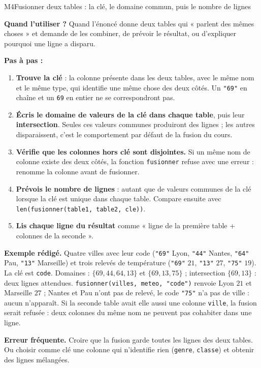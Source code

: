 \begin{fichemethode}{M4}{Fusionner deux tables : la clé, le domaine commun, puis le nombre de lignes}

\textbf{Quand l'utiliser ?} Quand l'énoncé donne deux tables qui « parlent des mêmes
choses » et demande de les combiner, de prévoir le résultat, ou d'expliquer pourquoi une
ligne a disparu.

\textbf{Pas à pas :}
\begin{enumerate}
  \item \textbf{Trouve la clé} : la colonne présente dans les deux tables, avec le même nom et
        le même type, qui identifie une même chose des deux côtés. Un \lstinline{"69"} en
        chaîne et un \lstinline{69} en entier ne se correspondront pas.
  \item \textbf{Écris le domaine de valeurs de la clé dans chaque table}, puis leur
        \textbf{intersection}. Seules ces valeurs communes produiront des lignes ; les autres
        disparaissent, c'est le comportement par défaut de la fusion du cours.
  \item \textbf{Vérifie que les colonnes hors clé sont disjointes.} Si un même nom de colonne
        existe des deux côtés, la fonction \lstinline{fusionner} refuse avec une erreur :
        renomme la colonne avant de fusionner.
  \item \textbf{Prévois le nombre de lignes} : autant que de valeurs communes de la clé
        lorsque la clé est unique dans chaque table. Compare ensuite avec
        \lstinline{len(fusionner(table1, table2, cle))}.
  \item \textbf{Lis chaque ligne du résultat} comme « ligne de la première table + colonnes de
        la seconde ».
\end{enumerate}

\textbf{Exemple rédigé.} Quatre villes avec leur code (\lstinline{"69"} Lyon,
\lstinline{"44"} Nantes, \lstinline{"64"} Pau, \lstinline{"13"} Marseille) et trois relevés
de température (\lstinline{"69"} $21$, \lstinline{"13"} $27$, \lstinline{"75"} $19$). La clé
est \lstinline{code}. Domaines : $\{69, 44, 64, 13\}$ et $\{69, 13, 75\}$ ; intersection
$\{69, 13\}$ : deux lignes attendues. \lstinline{fusionner(villes, meteo, "code")} renvoie
Lyon $21$ et Marseille $27$ ; Nantes et Pau n'ont pas de relevé, le code \lstinline{"75"}
n'a pas de ville : aucun n'apparaît. Si la seconde table avait elle aussi une colonne
\lstinline{ville}, la fusion serait refusée : deux colonnes du même nom ne peuvent pas
cohabiter dans une ligne.

\textbf{Erreur fréquente.} Croire que la fusion garde toutes les lignes des deux tables. Ou
choisir comme clé une colonne qui n'identifie rien (\lstinline{genre}, \lstinline{classe})
et obtenir des lignes mélangées.

\end{fichemethode}
